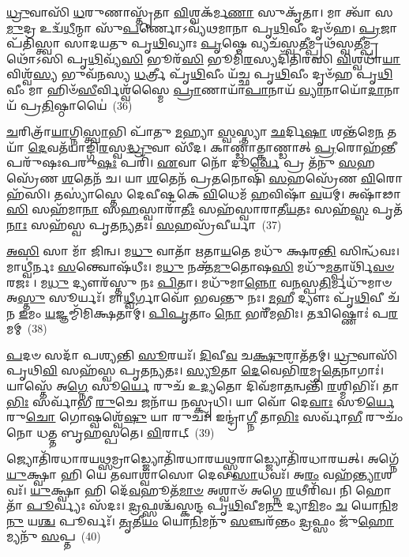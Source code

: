 \-\ul{𑌧𑍍𑌰𑍁}\-𑌵𑌾𑌸𑌿᳴ \ul{𑌧}\-𑌰𑍁𑌣𑌾𑌸𑍍𑌤𑍃᳴𑌤𑌾 \ul{𑌵𑌿}\-𑌶𑍍𑌵𑌕᳴𑌰𑍍𑌮\-\ul{𑌣𑌾} 𑌸𑍁𑌕𑍃᳴𑌤𑌾। 𑌮𑌾 𑌤𑍍𑌵𑌾᳴ 𑌸\-\ul{𑌮𑍁}\-𑌦𑍍𑌰 𑌉𑌦𑍍𑌵᳴\-\ul{𑌧𑍀}\-𑌨𑍍𑌮𑌾 𑌸𑍁᳴\-\ul{𑌪}\-𑌰𑍍𑌣𑍋\-𑌽𑌵𑍍𑌯᳴𑌥𑌮𑌾𑌨𑌾 𑌪𑍃\-\ul{𑌥𑌿}\-𑌵𑍀𑌂 𑌦𑍃𑍞᳴𑌹। \ul{𑌪𑍍𑌰}\-𑌜𑌾𑌪᳴𑌤𑌿𑌸𑍍𑌤𑍍𑌵𑌾 𑌸𑌾𑌦𑌯𑌤𑍁 𑌪𑍃\-\ul{𑌥𑌿}\-𑌵𑍍𑌯𑌾𑌃 \ul{𑌪𑍃}\-𑌷𑍍𑌠𑍇 𑌵𑍍𑌯𑌚᳴𑌸𑍍𑌵\-\ul{𑌤𑍀}\-𑌮𑍍𑌪𑍍𑌰𑌥᳴𑌸𑍍𑌵\-\ul{𑌤𑍀}\-𑌮𑍍𑌪𑍍𑌰𑌥𑍋᳴\-𑌽𑌸𑌿 𑌪𑍃\-\ul{𑌥𑌿}\-𑌵𑍍𑌯᳴\-\ul{𑌸𑌿} 𑌭𑍂𑌰᳴\-\ul{𑌸𑌿} 𑌭𑍂𑌮𑌿᳴\-\ul{𑌰}\-𑌸𑍍𑌯𑌦𑌿᳴𑌤𑌿𑌰𑌸𑌿 \ul{𑌵𑌿}\-𑌶𑍍𑌵𑌧𑌾᳴\-\ul{𑌯𑌾} 𑌵𑌿𑌶𑍍𑌵᳴\-\ul{𑌸𑍍𑌯} 𑌭𑍁𑌵᳴𑌨𑌸𑍍𑌯 \ul{𑌧}\-𑌰𑍍𑌤𑍍𑌰𑍀 𑌪𑍃᳴\-\ul{𑌥𑌿}\-𑌵𑍀𑌂 𑌯᳴𑌚𑍍𑌛 𑌪𑍃\-\ul{𑌥𑌿}\-𑌵𑍀𑌂 𑌦𑍃𑍞᳴𑌹 𑌪𑍃\-\ul{𑌥𑌿}\-𑌵𑍀𑌂 𑌮𑌾 𑌹𑌿𑍞᳴\-\ul{𑌸𑍀}\-𑌰𑍍𑌵𑌿𑌶𑍍𑌵᳴𑌸𑍍𑌮𑍈 \ul{𑌪𑍍𑌰𑌾}\-𑌣𑌾𑌯𑌾᳴\-\ul{𑌪𑌾}\-𑌨𑌾𑌯᳴ \ul{𑌵𑍍𑌯𑌾}\-𑌨𑌾𑌯𑍋᳴\-\ul{𑌦𑌾}\-𑌨𑌾𑌯᳴ 𑌪𑍍𑌰\-\ul{𑌤𑌿}\-𑌷𑍍𑌠𑌾𑌯𑍈॑~(36)

\-\ul{𑌚}\-𑌰𑌿𑌤𑍍𑌰𑌾᳴\-\ul{𑌯𑌾}\-𑌗𑍍𑌨𑌿\-\ul{𑌸𑍍𑌤𑍍𑌵𑌾}\-𑌭𑌿 𑌪𑌾᳴𑌤𑍁 \ul{𑌮}\-𑌹𑍍𑌯𑌾 \ul{𑌸𑍍𑌵}\-𑌸𑍍𑌤𑍍𑌯𑌾 \ul{𑌛}\-𑌰𑍍𑌦𑌿\-\ul{𑌷𑌾} 𑌶𑌨𑍍𑌤᳴𑌮𑍇\-\ul{𑌨} 𑌤𑌯𑌾᳴ \ul{𑌦𑍇}\-𑌵𑌤᳴𑌯𑌾𑌙𑍍𑌗𑌿\-\ul{𑌰}\-𑌸𑍍𑌵\-\ul{𑌦𑍍𑌧𑍍𑌰𑍁}\-𑌵𑌾 𑌸𑍀᳴𑌦। 𑌕𑌾𑌣𑍍𑌡𑌾॑𑌤𑍍𑌕𑌾𑌣𑍍𑌡𑌾𑌤𑍍 \ul{𑌪𑍍𑌰}\-𑌰𑍋𑌹᳴\-\ul{𑌨𑍍𑌤𑍀} 𑌪𑌰𑍁᳴𑌷𑌃𑌪𑌰𑍁\-\ul{𑌷𑌃} 𑌪𑌰𑌿᳴। \ul{𑌏}\-𑌵𑌾 𑌨𑍋᳴ 𑌦𑍂\-\ul{𑌰𑍍𑌵𑍇} 𑌪𑍍𑌰 𑌤᳴𑌨𑍁 \ul{𑌸}\-𑌹𑌸𑍍𑌰𑍇᳴𑌣 \ul{𑌶}\-𑌤𑍇𑌨᳴ 𑌚। 𑌯𑌾 \ul{𑌶}\-𑌤𑍇𑌨᳴ 𑌪𑍍𑌰\-\ul{𑌤}\-𑌨𑍋𑌷𑌿᳴ \ul{𑌸}\-𑌹𑌸𑍍𑌰𑍇᳴𑌣 \ul{𑌵𑌿}\-𑌰𑍋𑌹᳴𑌸𑌿। 𑌤𑌸𑍍𑌯𑌾॑𑌸𑍍𑌤𑍇 𑌦𑍇𑌵𑍀𑌷𑍍𑌟𑌕𑍇 \ul{𑌵𑌿}\-𑌧𑍇𑌮᳴ \ul{𑌹}\-𑌵𑌿𑌷𑌾᳴ \ul{𑌵}\-𑌯𑌮𑍍। 𑌅𑌷𑌾᳴𑌢𑌾\-\ul{𑌸𑌿} 𑌸𑌹᳴𑌮𑌾\-\ul{𑌨𑌾} 𑌸\-\ul{𑌹}\-𑌸𑍍𑌵𑌾𑌰𑌾᳴\-\ul{𑌤𑍀𑌃} 𑌸𑌹᳴𑌸𑍍𑌵𑌾𑌰𑌾𑌤𑍀\-\ul{𑌯}\-𑌤𑌃 𑌸𑌹᳴\-\ul{𑌸𑍍𑌵} 𑌪𑍃𑌤᳴\-\ul{𑌨𑌾𑌃} 𑌸𑌹᳴𑌸𑍍𑌵 𑌪𑍃𑌤\-\ul{𑌨𑍍𑌯}\-𑌤𑌃। \ul{𑌸}\-𑌹𑌸𑍍𑌰᳴𑌵𑍀𑌰𑍍𑌯𑌾~(37)

\-\ul{𑌅}\-\-\ul{𑌸𑌿} 𑌸𑌾 𑌮𑌾᳴ 𑌜𑌿𑌨𑍍𑌵। 𑌮\-\ul{𑌧𑍁} 𑌵𑌾𑌤𑌾᳴ 𑌋𑌤𑌾\-\ul{𑌯}\-𑌤𑍇 𑌮𑌧𑍁᳴ 𑌕𑍍𑌷𑌰\-\ul{𑌨𑍍𑌤𑌿} 𑌸𑌿𑌨𑍍𑌧᳴𑌵𑌃। 𑌮𑌾𑌧𑍍𑌵𑍀॑𑌰𑍍𑌨𑌃 \ul{𑌸}\-𑌨𑍍𑌤𑍍𑌵𑍋𑌷᳴𑌧𑍀𑌃। 𑌮\-\ul{𑌧𑍁} 𑌨𑌕𑍍𑌤᳴\-\ul{𑌮𑍁}\-𑌤𑍋𑌷\-\ul{𑌸𑌿} 𑌮𑌧𑍁᳴\-\ul{𑌮}\-𑌤𑍍𑌪𑌾𑌰𑍍𑌥𑌿᳴\-\ul{𑌵}\-\-\ul{𑍞} 𑌰𑌜𑌃। 𑌮\-\ul{𑌧𑍁} 𑌦𑍍𑌯𑍗𑌰᳴𑌸𑍍𑌤𑍁 𑌨𑌃 \ul{𑌪𑌿}\-𑌤𑌾। 𑌮𑌧𑍁᳴𑌮𑌾\-\ul{𑌨𑍍𑌨𑍋} 𑌵\-\ul{𑌨}\-𑌸𑍍𑌪\-\ul{𑌤𑌿}\-𑌰𑍍𑌮𑌧𑍁᳴𑌮𑌾𑍞 𑌅\-\ul{𑌸𑍍𑌤𑍁} 𑌸𑍂𑌰𑍍𑌯𑌃᳴। 𑌮𑌾\-\ul{𑌧𑍍𑌵𑍀}\-𑌰𑍍𑌗𑌾𑌵𑍋᳴ 𑌭𑌵𑌨𑍍𑌤𑍁 𑌨𑌃। \ul{𑌮}\-𑌹𑍀 𑌦𑍍𑌯𑍗𑌃 𑌪𑍃᳴\-\ul{𑌥𑌿}\-𑌵𑍀 𑌚᳴ 𑌨 \ul{𑌇}\-𑌮𑌂 \ul{𑌯}\-𑌜𑍍𑌞𑌮𑍍𑌮𑌿᳴𑌮𑌿𑌕𑍍𑌷𑌤𑌾𑌮𑍍। \ul{𑌪𑌿}\-\-\ul{𑌪𑍃}\-𑌤𑌾𑌂 \ul{𑌨𑍋} 𑌭𑌰𑍀᳴𑌮𑌭𑌿𑌃। 𑌤𑌦𑍍𑌵𑌿𑌷𑍍𑌣𑍋𑌃॑ 𑌪\-\ul{𑌰}\-𑌮𑌮𑍍~(38)

\-\ul{𑌪}\-𑌦𑍞 𑌸𑌦𑌾᳴ 𑌪𑌶𑍍𑌯𑌨𑍍𑌤𑌿 \ul{𑌸𑍂}\-𑌰𑌯𑌃᳴। \ul{𑌦𑌿}\-𑌵𑍀\-\ul{𑌵} 𑌚\-\ul{𑌕𑍍𑌷𑍁}\-𑌰𑌾𑌤᳴𑌤𑌮𑍍। \ul{𑌧𑍍𑌰𑍁}\-𑌵𑌾𑌸𑌿᳴ 𑌪𑍃𑌥𑌿\-\ul{𑌵𑌿} 𑌸𑌹᳴𑌸𑍍𑌵 𑌪𑍃𑌤\-\ul{𑌨𑍍𑌯}\-𑌤𑌃। \ul{𑌸𑍍𑌯𑍂}\-𑌤𑌾 \ul{𑌦𑍇}\-𑌵𑍇𑌭𑌿᳴\-\ul{𑌰}\-𑌮𑍃\-\ul{𑌤𑍇}\-𑌨𑌾𑌗𑌾𑌃॑। 𑌯𑌾𑌸𑍍𑌤𑍇᳴ 𑌅\-\ul{𑌗𑍍𑌨𑍇} 𑌸𑍂\-\ul{𑌰𑍍𑌯𑍇} 𑌰𑍁𑌚᳴ 𑌉\-\ul{𑌦𑍍𑌯}\-𑌤𑍋 𑌦𑌿𑌵᳴𑌮𑌾\-\ul{𑌤}\-𑌨𑍍𑌵𑌨𑍍𑌤𑌿᳴ \ul{𑌰}\-𑌶𑍍𑌮𑌿𑌭𑌿𑌃᳴। 𑌤𑌾\-\ul{𑌭𑌿𑌃} 𑌸𑌰𑍍𑌵𑌾᳴𑌭𑍀 \ul{𑌰𑍁}\-𑌚𑍇 𑌜𑌨𑌾᳴𑌯 𑌨𑌸𑍍𑌕𑍃𑌧𑌿। 𑌯𑌾 𑌵𑍋᳴ 𑌦𑍇\-\ul{𑌵𑌾𑌃} 𑌸𑍂\-\ul{𑌰𑍍𑌯𑍇} 𑌰𑍁\-\ul{𑌚𑍋} 𑌗𑍋𑌷𑍍𑌵𑌶𑍍𑌵𑍇᳴\-\ul{𑌷𑍁} 𑌯𑌾 𑌰𑍁𑌚𑌃᳴। 𑌇𑌨𑍍𑌦𑍍𑌰𑌾॑\-\ul{𑌗𑍍𑌨𑍀} 𑌤𑌾\-\ul{𑌭𑌿𑌃} 𑌸𑌰𑍍𑌵𑌾᳴\-\ul{𑌭𑍀} 𑌰𑍁𑌚𑌂᳴ 𑌨𑍋 𑌧𑌤𑍍𑌤 𑌬𑍃𑌹𑌸𑍍𑌪𑌤𑍇। \ul{𑌵𑌿}\-𑌰𑌾𑌟𑍍~(39)

𑌜𑍍𑌯𑍋𑌤𑌿᳴𑌰𑌧𑌾𑌰𑌯\-\ul{𑌥𑍍𑌸}\-𑌮𑍍𑌰𑌾𑌡𑍍𑌜𑍍𑌯𑍋𑌤𑌿᳴𑌰𑌧𑌾𑌰𑌯\-\ul{𑌥𑍍𑌸𑍍𑌵}\-𑌰𑌾𑌡𑍍𑌜𑍍𑌯𑍋𑌤𑌿᳴𑌰𑌧𑌾𑌰𑌯𑌤𑍍। 𑌅𑌗𑍍𑌨𑍇᳴ \ul{𑌯𑍁}\-𑌕𑍍𑌷𑍍𑌵𑌾 𑌹𑌿 𑌯𑍇 𑌤𑌵𑌾𑌶𑍍𑌵𑌾᳴𑌸𑍋 𑌦𑍇𑌵 \ul{𑌸𑌾}\-𑌧𑌵𑌃᳴। 𑌅\-\ul{𑌰𑌂} 𑌵𑌹᳴\-\ul{𑌨𑍍𑌤𑍍𑌯𑌾}\-𑌶𑌵𑌃᳴। \ul{𑌯𑍁}\-𑌕𑍍𑌷𑍍𑌵𑌾 𑌹𑌿 𑌦𑍇᳴\-\ul{𑌵}\-𑌹𑍂𑌤᳴\-\ul{𑌮𑌾}\-\-\ul{𑍞} 𑌅𑌶𑍍𑌵𑌾𑍞᳴ 𑌅𑌗𑍍𑌨𑍇 \ul{𑌰}\-𑌥𑍀𑌰𑌿᳴𑌵। 𑌨𑌿 𑌹𑍋𑌤𑌾᳴ \ul{𑌪𑍂}\-𑌰𑍍𑌵𑍍𑌯𑌃 𑌸᳴𑌦𑌃। \ul{𑌦𑍍𑌰}\-𑌫𑍍𑌸𑌶𑍍𑌚᳴𑌸𑍍𑌕𑌨𑍍𑌦 𑌪𑍃\-\ul{𑌥𑌿}\-𑌵𑍀𑌮\-\ul{𑌨𑍁} 𑌦𑍍𑌯𑌾\-\ul{𑌮𑌿}\-𑌮𑌂 \ul{𑌚} 𑌯𑍋\-\ul{𑌨𑌿}\-𑌮\-\ul{𑌨𑍁} 𑌯\-\ul{𑌶𑍍𑌚} 𑌪𑍂𑌰𑍍𑌵𑌃᳴। \ul{𑌤𑍃}\-𑌤𑍀\-\ul{𑌯𑌂} 𑌯𑍋\-\ul{𑌨𑌿}\-𑌮𑌨𑍁᳴ \ul{𑌸}\-𑌞𑍍𑌚𑌰᳴𑌨𑍍𑌤𑌂 \ul{𑌦𑍍𑌰}\-𑌫𑍍𑌸𑌂 𑌜𑍁᳴\-\ul{𑌹𑍋}\-𑌮𑍍𑌯𑌨𑍁᳴ \ul{𑌸}\-𑌪𑍍𑌤~(40)

